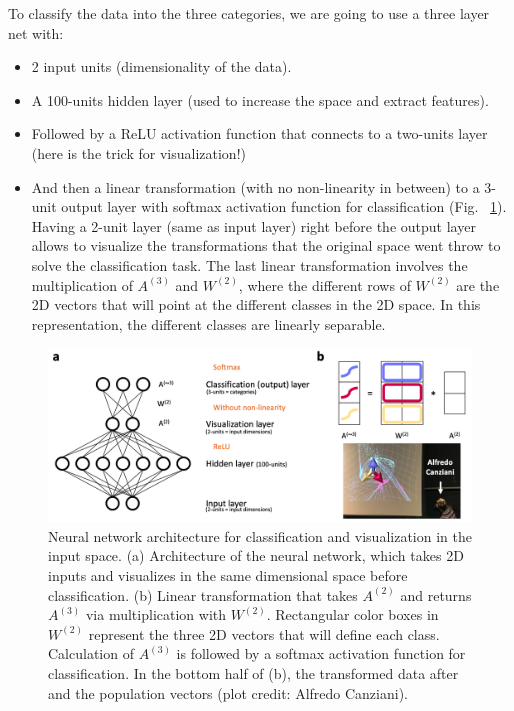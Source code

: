 \noindent
To classify the data into the three categories, we are going to use a three layer net with: 
\begin{itemize}
\item[(1)] 2 input units (dimensionality of the data).
\item[(2)] A 100-units hidden layer (used to increase the space and extract features).
\item[(3)] Followed by a ReLU activation function that connects to a two-units layer (here is the trick for visualization!) 
\item[(4)] And then a linear transformation (with no non-linearity in between) to a 3-unit output layer with softmax activation function for classification 
(Fig. ~\ref{fig:ArchitectureForClassificationAndVisualizationInTheInputSpace}). 
Having a 2-unit layer (same as input layer) right before the output layer allows to visualize the transformations 
that the original space went throw to solve the classification task. 
The last linear transformation involves the multiplication of $A^{(3)}$ and $W^{(2)}$, 
where the different rows of $W^{(2)}$ are the 2D vectors that will point at the different classes in the 2D space. 
In this representation, the different classes are linearly separable.
\end{itemize}

\begin{figure}[!h]
\centering
\includegraphics[width=170mm]{lectures/04-a/images/ArchitectureForClassificationAndVisualizationInTheInputSpace.png}
\caption{Neural network architecture for classification and visualization in the input space. (a) Architecture of the neural network, which takes 2D inputs and visualizes in the same dimensional space before classification. (b) Linear transformation that takes $A^{(2)}$ and returns $A^{(3)}$ via multiplication with $W^{(2)}$. Rectangular color boxes in $W^{(2)}$ represent the three 2D vectors that will define each class. Calculation of $A^{(3)}$ is followed by a softmax activation function for classification. In the bottom half of (b), the transformed data after and the population vectors (plot credit: Alfredo Canziani).}
\label{fig:ArchitectureForClassificationAndVisualizationInTheInputSpace}
\end{figure}

